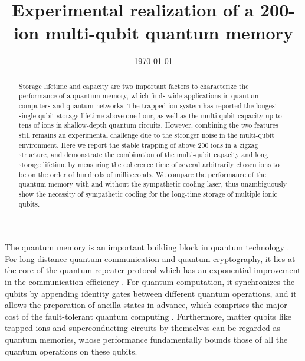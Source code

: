 \documentclass[aps,prl,reprint,superscriptaddress,twocolumn,longbibliography]{revtex4-1}
\begin{document}

\title{Experimental realization of a 200-ion multi-qubit quantum memory}%

\author{}

\date{\today}

\begin{abstract}
  Storage lifetime and capacity are two important factors to characterize the performance of a quantum memory, which finds wide applications in quantum computers and quantum networks. The trapped ion system has reported the longest single-qubit storage lifetime above one hour, as well as the multi-qubit capacity up to tens of ions in shallow-depth quantum circuits. However, combining the two features still remains an experimental challenge due to the stronger noise in the multi-qubit environment. Here we report the stable trapping of above 200 ions in a zigzag structure, and demonstrate the combination of the multi-qubit capacity and long storage lifetime by measuring the coherence time of several arbitrarily chosen ions to be on the order of hundreds of milliseconds. We compare the performance of the quantum memory with and without the sympathetic cooling laser, thus unambiguously show the necessity of sympathetic cooling for the long-time storage of multiple ionic qubits.
\end{abstract}


\maketitle

The quantum memory is an important building block in quantum technology \cite{lvovsky2009optical}. For long-distance quantum communication and quantum cryptography, it lies at the core of the quantum repeater protocol which has an exponential improvement in the communication efficiency \cite{PhysRevLett.81.5932,duan2001long,RevModPhys.83.33}. For quantum computation, it synchronizes the qubits by appending identity gates between different quantum operations, and it allows the preparation of ancilla states in advance, which comprises the major cost of the fault-tolerant quantum computing \cite{Gottesman1998,campbell2017roads,PhysRevA.86.032324}. Furthermore, matter qubits like trapped ions \cite{doi:10.1063/1.5088164} and superconducting circuits \cite{doi:10.1146/annurev-conmatphys-031119-050605,huang2020superconducting} by themselves can be regarded as quantum memories, whose performance fundamentally bounds those of all the quantum operations on these qubits.
\end{document}
